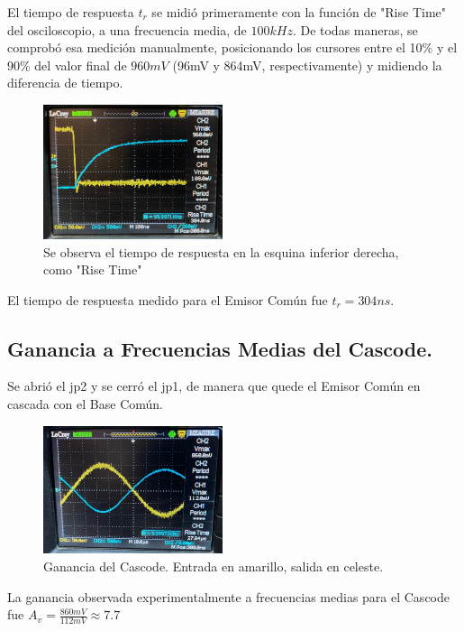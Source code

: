 \documentclass[letterpaper, 10 pt, conference]{ieeeconf}  %
\begin{document}
El tiempo de respuesta $t_r$ se midió primeramente con la función de "Rise Time" del osciloscopio, a una frecuencia media, de $100kHz$. De todas maneras, se comprobó esa medición manualmente, posicionando los cursores entre el 10\% y el 90\% del valor final de $960mV$ (96mV y 864mV, respectivamente) y midiendo la diferencia de tiempo.\\


\begin{figure}[H]
  \centering
  \includegraphics[width=0.47\textwidth]{imagenes/tiempo de respuesta EC.png}
  \caption{Se observa el tiempo de respuesta en la esquina inferior derecha, como "Rise Time"}
  \label{fig:tr_EC}
\end{figure}

El tiempo de respuesta medido para el Emisor Común fue $t_r = 304ns$.

\subsection{\textbf{Ganancia a Frecuencias Medias del Cascode.}}

Se abrió el jp2 y se cerró el jp1, de manera que quede el Emisor Común en cascada con el Base Común.

\begin{figure}[H]
  \centering
  \includegraphics[width=0.47\textwidth]{imagenes/ganancia_cascode.jpg}
  \caption{Ganancia del Cascode. Entrada en amarillo, salida en celeste.}
  \label{fig:ganancia_EC}
\end{figure}

La ganancia observada experimentalmente a frecuencias medias para el Cascode fue $A_v = \frac{860mV}{112mV} \approx 7.7 $\\
\end{document}
